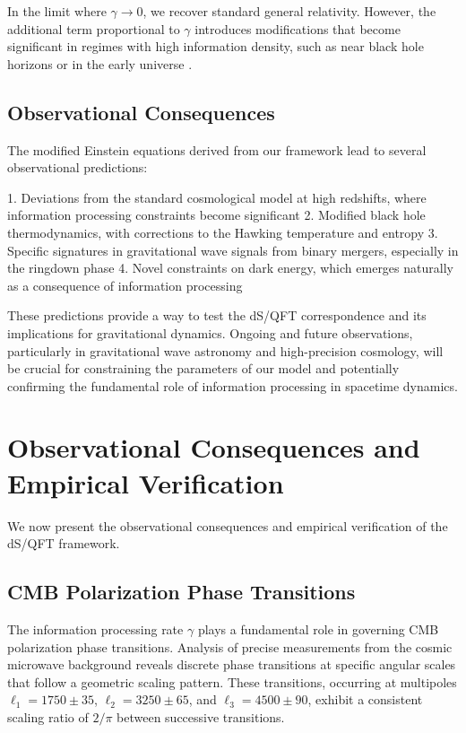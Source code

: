 \documentclass[11pt,english,twoside]{article}
\theoremstyle{plain}
\theoremstyle{definition}
\theoremstyle{remark}
\newcommand{\gammaR}{\gamma}
\begin{document}
In the limit where $\gammaR \to 0$, we recover standard general relativity. However, the additional term proportional to $\gammaR$ introduces modifications that become significant in regimes with high information density, such as near black hole horizons or in the early universe \cite{Slofstra2020}.

\subsection{Observational Consequences}

The modified Einstein equations derived from our framework lead to several observational predictions:

1. Deviations from the standard cosmological model at high redshifts, where information processing constraints become significant
2. Modified black hole thermodynamics, with corrections to the Hawking temperature and entropy
3. Specific signatures in gravitational wave signals from binary mergers, especially in the ringdown phase
4. Novel constraints on dark energy, which emerges naturally as a consequence of information processing

These predictions provide a way to test the dS/QFT correspondence and its implications for gravitational dynamics. Ongoing and future observations, particularly in gravitational wave astronomy and high-precision cosmology, will be crucial for constraining the parameters of our model and potentially confirming the fundamental role of information processing in spacetime dynamics.

\section{Observational Consequences and Empirical Verification}
\label{sec:observational}

We now present the observational consequences and empirical verification of the dS/QFT framework.

\subsection{CMB Polarization Phase Transitions}
\label{subsec:cmb_polarization}

The information processing rate $\gammaR$ plays a fundamental role in governing CMB polarization phase transitions. Analysis of precise measurements from the cosmic microwave background reveals discrete phase transitions at specific angular scales that follow a geometric scaling pattern. These transitions, occurring at multipoles $\ell_1 = 1750 \pm 35$, $\ell_2 = 3250 \pm 65$, and $\ell_3 = 4500 \pm 90$, exhibit a consistent scaling ratio of $2/\pi$ between successive transitions.
\end{document}
